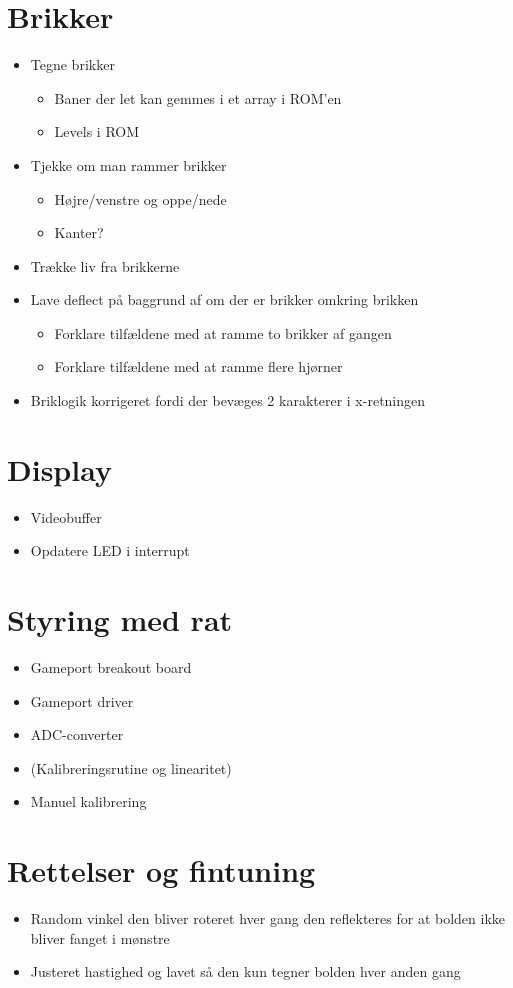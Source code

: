 \section{Brikker}
\begin{itemize}
\item Tegne brikker
\begin{itemize}
\item Baner der let kan gemmes i et array i ROM'en
\item Levels i ROM
\end{itemize}
\item Tjekke om man rammer brikker
\begin{itemize}
\item Højre/venstre og oppe/nede
\item Kanter?
\end{itemize}
\item Trække liv fra brikkerne
\item Lave deflect på baggrund af om der er brikker omkring brikken
\begin{itemize}
\item Forklare tilfældene med at ramme to brikker af gangen
\item Forklare tilfældene med at ramme flere hjørner
\end{itemize}
\item Briklogik korrigeret fordi der bevæges 2 karakterer i x-retningen
\end{itemize}

		

\section{Display}
\begin{itemize}
\item Videobuffer
\item Opdatere LED i interrupt
\end{itemize}

\section{Styring med rat}
\begin{itemize}
\item Gameport breakout board
\item Gameport driver
\item ADC-converter
\item (Kalibreringsrutine og linearitet)
\item Manuel kalibrering
\end{itemize}


\section{Rettelser og fintuning}
\begin{itemize}
\item Random vinkel den bliver roteret hver gang den reflekteres for at bolden ikke bliver fanget i mønstre
\item Justeret hastighed og lavet så den kun tegner bolden hver anden gang
\end{itemize}